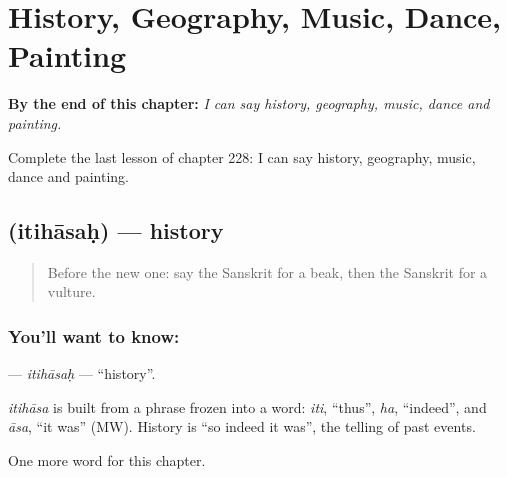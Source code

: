 
\chapter{History, Geography, Music, Dance, Painting}
\label{ch:sa-history-geography-music-dance-painting}

\begin{chapteropening}
\textbf{By the end of this chapter:} \emph{I can say history, geography, music, dance and painting.}

Complete the last lesson of chapter 228: I can say history, geography, music, dance and painting.
\end{chapteropening}

\section[\texorpdfstring{\sk{इतिहासः} (itihāsaḥ)}{इतिहासः (itihāsaḥ)}]{ (itihāsaḥ) — history}

\label{lesson:SA-C228-itihasah}



\begin{quote}
Before the new one: say the Sanskrit for a beak, then the Sanskrit for a vulture.
\end{quote}

\subsection*{You'll want to know: }
\textbf{} — \emph{itihāsaḥ} — \textquotedblleft{}history\textquotedblright{}.

\begin{cousinweb}
\emph{itihāsa} is built from a phrase frozen into a word: \emph{iti}, \textquotedblleft{}thus\textquotedblright{}, \emph{ha}, \textquotedblleft{}indeed\textquotedblright{}, and \emph{āsa}, \textquotedblleft{}it was\textquotedblright{} (MW). History is \textquotedblleft{}so indeed it was\textquotedblright{}, the telling of past events.
\end{cousinweb}

\begin{grammarlens}[title={What you've built}]
One more word for this chapter.
\end{grammarlens}

